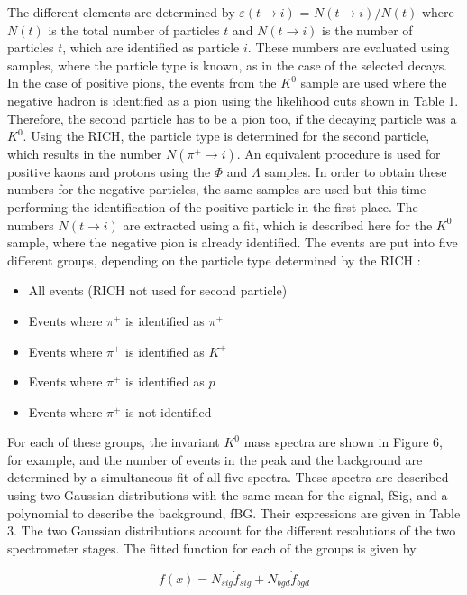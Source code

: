 The different elements are determined by $\varepsilon(t \rightarrow i)$ = $N(t \rightarrow i)/N(t)$ where $N(t)$ is the total number of particles $t$ and $N(t \rightarrow i)$ is the number of particles $t$, which are
identified as particle $i$. These numbers are evaluated using samples, where the particle type is known, as in the case of the selected decays.
In the case of positive pions, the events from the $K^0$ sample are used where the negative hadron is identified as a pion using the likelihood cuts shown in Table 1.
 Therefore, the second particle has to be a pion too, if the decaying particle was a $K^0$. Using the RICH, the particle type is determined for the second particle, which
 results in the number $N(\pi^+ \rightarrow i)$. An equivalent procedure is used for positive kaons and protons using the $\Phi$ and $\Lambda$ samples.
In order to obtain these numbers for the negative particles, the same samples are used but this time performing the identification of the positive particle in the first
place. The numbers $N(t \rightarrow i)$ are extracted using a fit, which is described here for the $K^0$ sample, where the negative pion is already identified. The events are put into
five different groups, depending on the particle type determined by the RICH :

\begin{itemize}
  \item All events (RICH not used for second particle)
  \item Events where $\pi^+$ is identified as $\pi^+$
  \item Events where $\pi^+$ is identified as $K^+$
  \item Events where $\pi^+$ is identified as $p$
  \item Events where $\pi^+$ is not identified
\end{itemize}

For each of these groups, the invariant $K^0$ mass spectra are shown in Figure 6, for example, and the number of events in the peak and the background are determined by a
simultaneous fit of all five spectra. These spectra are described using two Gaussian distributions with the same mean for the signal, fSig, and a polynomial to describe
the background, fBG. Their expressions are given in Table 3. The two Gaussian distributions account for the different resolutions of the two spectrometer stages. The
fitted function for each of the groups is given by

\begin{equation}
  f(x) = N_{sig} \dot f_{sig} + N_{bgd} \dot f_{bgd}
\end{equation}

